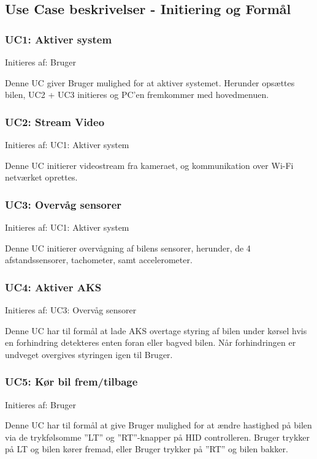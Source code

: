 
\subsection{Use Case beskrivelser - Initiering og Formål} 
\subsubsection{UC1: Aktiver system}
Initieres af: Bruger

Denne UC giver Bruger mulighed for at aktiver systemet. Herunder opsættes bilen, UC2 + UC3 initieres og PC'en fremkommer med hovedmenuen. 


\subsubsection{UC2: Stream Video}
Initieres af: UC1: Aktiver system

Denne UC initierer videostream fra kameraet, og kommunikation over Wi-Fi netværket oprettes.


\subsubsection{UC3: Overvåg sensorer}
Initieres af: UC1: Aktiver system

Denne UC initierer overvågning af bilens sensorer, herunder, de 4 afstandssensorer, tachometer, samt accelerometer. 


\subsubsection{UC4: Aktiver AKS}
Initieres af: UC3: Overvåg sensorer

Denne UC har til formål at lade AKS overtage styring af bilen under kørsel hvis en forhindring detekteres enten foran eller bagved bilen.
Når forhindringen er undveget overgives styringen igen til Bruger.


\subsubsection{UC5: Kør bil frem/tilbage}
Initieres af: Bruger

Denne UC har til formål at give Bruger mulighed for at ændre hastighed på bilen via  de trykfølsomme ''LT'' og ''RT''-knapper på HID controlleren. Bruger trykker på LT og bilen kører fremad, eller Bruger trykker på ''RT'' og bilen bakker.


